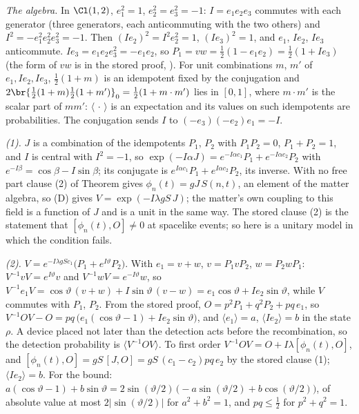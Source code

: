 \emph{The algebra.} In $\Cl(1,2)$, $e_{1}^{2} = 1$, $e_{2}^{2} = e_{3}^{2} = -1$: $I = e_{1}e_{2}e_{3}$ commutes with each generator (three generators, each anticommuting with the two others) and $I^{2} = -e_{1}^{2}e_{2}^{2}e_{3}^{2} = -1$. Then $(Ie_{2})^{2} = I^{2}e_{2}^{2} = 1$, $(Ie_{3})^{2} = 1$, and $e_{1}$, $Ie_{2}$, $Ie_{3}$ anticommute. $Ie_{3} = e_{1}e_{2}e_{3}^{2} = -e_{1}e_{2}$, so $P_{1} = vw = \tfrac12(1 - e_{1}e_{2}) = \tfrac12(1 + Ie_{3})$ (the form of $vw$ is in the stored proof, ). For unit combinations $m$, $m'$ of $e_{1}, Ie_{2}, Ie_{3}$, $\tfrac12(1 + m)$ is an idempotent fixed by the conjugation and $2\br{\tfrac12(1 + m)\tfrac12(1 + m')}_{0} = \tfrac12(1 + m \cdot m')$ lies in $[0,1]$, where $m \cdot m'$ is the scalar part of $mm'$: $\langle\,\cdot\,\rangle$ is an expectation and its values on such idempotents are probabilities. The conjugation sends $I$ to $(-e_{3})(-e_{2})e_{1} = -I$.

\emph{(1).} $J$ is a combination of the idempotents $P_{1}$, $P_{2}$ with $P_{1}P_{2} = 0$, $P_{1} + P_{2} = 1$, and $I$ is central with $I^{2} = -1$, so $\exp(-I\alpha J) = e^{-I\alpha c_{1}}P_{1} + e^{-I\alpha c_{2}}P_{2}$ with $e^{-I\beta} = \cos\beta - I\sin\beta$; its conjugate is $e^{I\alpha c_{1}}P_{1} + e^{I\alpha c_{2}}P_{2}$, its inverse. With no free part clause (2) of Theorem  gives $\phi_{n}(t) = gJ\,S(n,t)$, an element of the matter algebra, so (D) gives $V = \exp(-I\lambda gS\,J)$; the matter's own coupling to this field is a function of $J$ and is a unit in the same way. The stored clause (2) is the statement that $[\phi_{n}(t), O] \neq 0$ at spacelike events; so here is a unitary model in which the condition fails.

\emph{(2).} $V = e^{-I\lambda gSc_{1}}\bigl(P_{1} + e^{I\vartheta}P_{2}\bigr)$. With $e_{1} = v + w$, $v = P_{1}vP_{2}$, $w = P_{2}wP_{1}$: $V^{-1}vV = e^{I\vartheta}v$ and $V^{-1}wV = e^{-I\vartheta}w$, so $V^{-1}e_{1}V = \cos\vartheta\,(v + w) + I\sin\vartheta\,(v - w) = e_{1}\cos\vartheta + Ie_{2}\sin\vartheta$, while $V$ commutes with $P_{1}$, $P_{2}$. From the stored proof, $O = p^{2}P_{1} + q^{2}P_{2} + pq\,e_{1}$, so $V^{-1}OV - O = pq\,\bigl(e_{1}(\cos\vartheta - 1) + Ie_{2}\sin\vartheta\bigr)$, and $\langle e_{1}\rangle = a$, $\langle Ie_{2}\rangle = b$ in the state $\rho$. A device placed not later than the detection acts before the recombination, so the detection probability is $\langle V^{-1}OV\rangle$. To first order $V^{-1}OV = O + I\lambda[\phi_{n}(t), O]$, and $[\phi_{n}(t), O] = gS\,[J, O] = gS\,(c_{1} - c_{2})pq\,e_{2}$ by the stored clause (1); $\langle Ie_{2}\rangle = b$. For the bound: $a(\cos\vartheta - 1) + b\sin\vartheta = 2\sin(\vartheta/2)\,\bigl(-a\sin(\vartheta/2) + b\cos(\vartheta/2)\bigr)$, of absolute value at most $2|\sin(\vartheta/2)|$ for $a^{2} + b^{2} = 1$, and $pq \le \tfrac12$ for $p^{2} + q^{2} = 1$.

